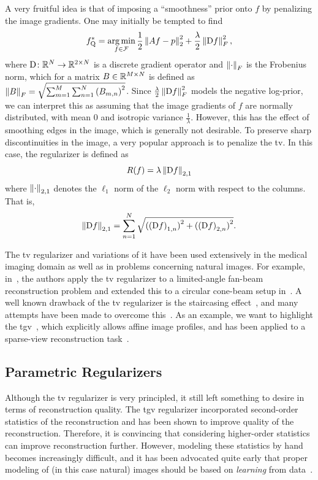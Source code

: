 \documentclass[../ml-ct.tex]{subfiles}
\begin{document}
A very fruitful idea is that of imposing a \enquote{smoothness} prior onto \( f \) by penalizing the image gradients.
One may initially be tempted to find
\begin{equation}
	f^*_{\text{Q}} = \operatorname*{arg\,min}_{f \in \mathcal{F}} \frac{1}{2} \left\lVert Af - p\right\rVert_2^2 + \frac{\lambda}{2} \left\lVert\mathrm{D} f\right\rVert_F^2,
\end{equation}
where \( \mathrm{D}\colon\mathbb{R}^N\to\mathbb{R}^{2 \times N} \) is a discrete gradient operator and \( \left\lVert\cdot\right\rVert_F \) is the Frobenius norm, which for a matrix \( B \in \mathbb{R}^{M \times N} \) is defined as \( \left\lVert B\right\rVert_F = \sqrt{\sum_{m=1}^M \sum_{n=1}^N {(B_{m,n})}^2} \).
Since \( \frac{\lambda}{2} \left\lVert\mathrm{D} f\right\rVert_F^2 \) models the negative log-prior, we can interpret this as assuming that the image gradients of \( f \) are normally distributed, with mean \num{0} and isotropic variance \( \frac{1}{\lambda} \).
However, this has the effect of smoothing edges in the image, which is generally not desirable.
To preserve sharp discontinuities in the image, a very popular approach is to penalize the \gls{tv}.
In this case, the regularizer is defined as
\begin{equation}
	R(f) = \lambda \left\lVert\mathrm{D} f\right\rVert_{2, 1}
\end{equation}
where \( \left\lVert\cdot\right\rVert_{2, 1} \) denotes the \( \ell_1  \) norm of the \( \ell_2 \) norm with respect to the columns.
That is,
\begin{equation}
	\left\lVert\mathrm{D} f\right\rVert_{2, 1} = \sum_{n=1}^N \sqrt{{({(\mathrm{D} f)}_{1,n})}^2 + {({(\mathrm{D} f)}_{2,n})}^2}.
\end{equation}

The \gls{tv} regularizer and variations of it have been used extensively in the medical imaging domain as well as in problems concerning natural images.
For example, in~\cite{sidky_accurate_2006}, the authors apply the \gls{tv} regularizer to a limited-angle fan-beam reconstruction problem and extended this to a circular cone-beam setup in~\cite{sidky_reconstruction_2008}.
A well known drawback of the \gls{tv} regularizer is the staircasing effect~\cite{tang_performance_2009}, and many attempts have been made to overcome this~\cite{liu_total_2014,niu_sparse_2014,tian_reconstruction_2011,yang_high_2010,zhang_few-view_2013}.
As an example, we want to highlight the \gls{tgv}~\cite{bredies_total_2010}, which explicitly allows affine image profiles, and has been applied to a sparse-view reconstruction task~\cite{niu_sparse_2014}.
\subsection{Parametric Regularizers}
Although the \gls{tv} regularizer is very principled, it still left something to desire in terms of reconstruction quality.
The \gls{tgv} regularizer incorporated second-order statistics of the reconstruction and has been shown to improve quality of the reconstruction.
Therefore, it is convincing that considering higher-order statistics can improve reconstruction further.
However, modeling these statistics by hand becomes increasingly difficult, and it has been advocated quite early that proper modeling of (in this case natural) images should be based on \emph{learning} from data~\cite{zhu_filters_1998}.
\end{document}

